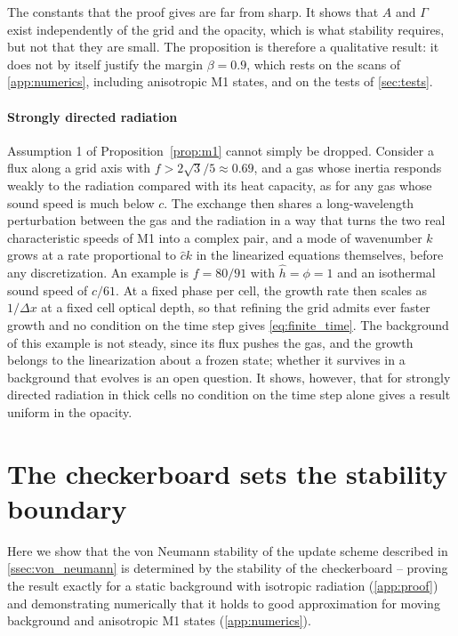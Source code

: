 \documentclass[preprint,12pt,authoryear]{elsarticle}
\begin{document}
\begin{appendix}
The constants that the proof gives are far from sharp. It shows that $A$ and $\Gamma$ exist independently of the grid and the opacity, which is what stability requires, but not that they are small. The proposition is therefore a qualitative result: it does not by itself justify the margin $\beta = 0.9$, which rests on the scans of \ref{app:numerics}, including anisotropic M1 states, and on the tests of \autoref{sec:tests}.

\paragraph{Strongly directed radiation} Assumption 1 of Proposition~\ref{prop:m1} cannot simply be dropped. Consider a flux along a grid axis with $f > 2\sqrt{3}/5 \approx 0.69$, and a gas whose inertia responds weakly to the radiation compared with its heat capacity, as for any gas whose sound speed is much below $c$. The exchange then shares a long-wavelength perturbation between the gas and the radiation in a way that turns the two real characteristic speeds of M1 into a complex pair, and a mode of wavenumber $k$ grows at a rate proportional to $\hat{c}k$ in the linearized equations themselves, before any discretization. An example is $f = 80/91$ with $\hat{h} = \phi = 1$ and an isothermal sound speed of $c/61$. At a fixed phase per cell, the growth rate then scales as $1/\Delta x$ at a fixed cell optical depth, so that refining the grid admits ever faster growth and no condition on the time step gives \autoref{eq:finite_time}. The background of this example is not steady, since its flux pushes the gas, and the growth belongs to the linearization about a frozen state; whether it survives in a background that evolves is an open question. It shows, however, that for strongly directed radiation in thick cells no condition on the time step alone gives a result uniform in the opacity.


\section{The checkerboard sets the stability boundary}
\label{app:theta}

Here we show that the von Neumann stability of the update scheme described in \autoref{ssec:von_neumann} is determined by the stability of the checkerboard -- proving the result exactly for a static background with isotropic radiation (\ref{app:proof}) and demonstrating numerically that it holds to good approximation for moving background and anisotropic M1 states (\ref{app:numerics}).


\end{appendix}
\end{document}
